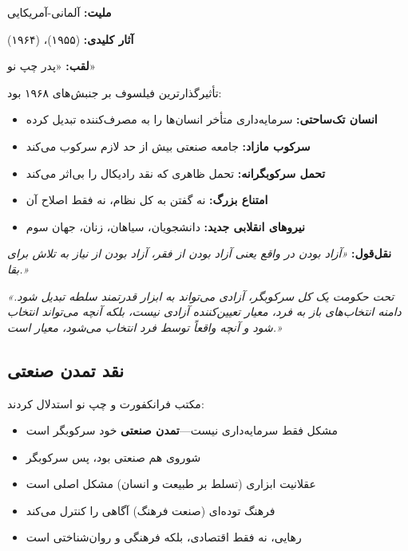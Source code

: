 \begin{personbox}

\textbf{ملیت:} آلمانی-آمریکایی

\textbf{آثار کلیدی:}  (۱۹۵۵)،  (۱۹۶۴)

\textbf{لقب:} «پدر چپ نو»

\mediumspace

 تأثیرگذارترین فیلسوف بر جنبش‌های ۱۹۶۸ بود:

\begin{itemize}[nosep]
    \item \textbf{انسان تک‌ساحتی:} سرمایه‌داری متأخر انسان‌ها را به مصرف‌کننده تبدیل کرده
    \item \textbf{سرکوب مازاد:} جامعه صنعتی بیش از حد لازم سرکوب می‌کند
    \item \textbf{تحمل سرکوبگرانه:} تحمل ظاهری که نقد رادیکال را بی‌اثر می‌کند
    \item \textbf{امتناع بزرگ:} نه گفتن به کل نظام، نه فقط اصلاح آن
    \item \textbf{نیروهای انقلابی جدید:} دانشجویان، سیاهان، زنان، جهان سوم
\end{itemize}

\mediumspace

\textbf{نقل‌قول:} \textit{«آزاد بودن در واقع یعنی آزاد بودن از فقر، آزاد بودن از نیاز به تلاش برای بقا.»}
\end{personbox}

\begin{quotebox}
\textit{«تحت حکومت یک کل سرکوبگر، آزادی می‌تواند به ابزار قدرتمند سلطه تبدیل شود. دامنه انتخاب‌های باز به فرد، معیار تعیین‌کننده آزادی نیست، بلکه آنچه می‌تواند انتخاب شود و آنچه واقعاً توسط فرد انتخاب می‌شود، معیار است.»}
\end{quotebox}

\subsection{نقد تمدن صنعتی}

\begin{defbox}
مکتب فرانکفورت و چپ نو استدلال کردند:
\begin{itemize}[nosep]
    \item مشکل فقط سرمایه‌داری نیست—\textbf{تمدن صنعتی} خود سرکوبگر است
    \item شوروی هم صنعتی بود، پس سرکوبگر
    \item عقلانیت ابزاری (تسلط بر طبیعت و انسان) مشکل اصلی است
    \item فرهنگ توده‌ای (صنعت فرهنگ) آگاهی را کنترل می‌کند
    \item رهایی، نه فقط اقتصادی، بلکه فرهنگی و روان‌شناختی است
\end{itemize}
\end{defbox}


